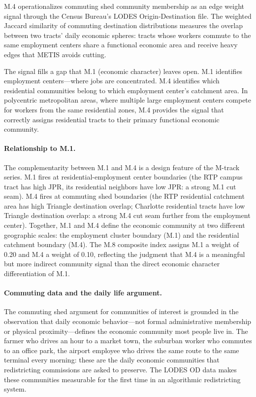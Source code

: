 \label{sec:conclusion}

M.4 operationalizes commuting shed community membership as an edge weight
signal through the Census Bureau's LODES Origin-Destination file.
The weighted Jaccard similarity of commuting destination distributions
measures the overlap between two tracts' daily economic spheres: tracts
whose workers commute to the same employment centers share a functional
economic area and receive heavy edges that METIS avoids cutting.

The signal fills a gap that M.1 (economic character) leaves open.
M.1 identifies employment centers---where jobs are concentrated.
M.4 identifies which residential communities belong to which employment
center's catchment area.
In polycentric metropolitan areas, where multiple large employment centers
compete for workers from the same residential zones, M.4 provides the
signal that correctly assigns residential tracts to their primary functional
economic community.

\paragraph{Relationship to M.1.}
The complementarity between M.1 and M.4 is a design feature of the M-track
series.
M.1 fires at residential-employment center boundaries (the RTP campus
tract has high JPR, its residential neighbors have low JPR: a strong
M.1 cut seam).
M.4 fires at commuting shed boundaries (the RTP residential catchment
area has high Triangle destination overlap; Charlotte residential tracts
have low Triangle destination overlap: a strong M.4 cut seam further from
the employment center).
Together, M.1 and M.4 define the economic community at two different
geographic scales: the employment cluster boundary (M.1) and the
residential catchment boundary (M.4).
The M.8 composite index \citep{m8composite} assigns M.1 a weight of 0.20
and M.4 a weight of 0.10, reflecting the judgment that M.4 is a meaningful
but more indirect community signal than the direct economic character
differentiation of M.1.

\paragraph{Commuting data and the daily life argument.}
The commuting shed argument for communities of interest is grounded in
the observation that daily economic behavior---not formal administrative
membership or physical proximity---defines the economic community most
people live in.
The farmer who drives an hour to a market town, the suburban worker who
commutes to an office park, the airport employee who drives the same
route to the same terminal every morning: these are the daily economic
communities that redistricting commissions are asked to preserve.
The LODES OD data makes these communities measurable for the first time
in an algorithmic redistricting system.

